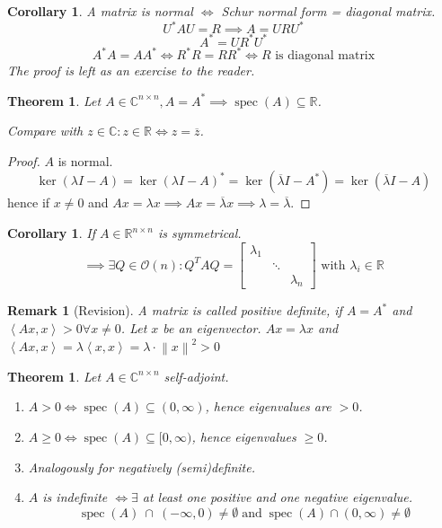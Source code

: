 \documentclass[a4paper]{article}
\newcounter{lecref}[section]
\numberwithin{lecref}{section}
\newtheorem{theorem}[lecref]{Theorem}
\newtheorem*{Remark}{Remark}
\newtheorem{corollary}[lecref]{Corollary}
\newcommand{\angel}[1]{\left\langle#1\right\rangle}
\newcommand{\norm}[1]{\left\|#1\right\|}
\begin{document}
\begin{corollary}
  A matrix is normal $\iff$ Schur normal form = diagonal matrix.
  \[ U^* AU = R \implies A = URU^* \]
  \[ A^* = UR^* U^* \]
  \[ A^* A = AA^* \iff R^* R = RR^* \iff R \text{ is diagonal matrix} \]
  The proof is left as an exercise to the reader.
\end{corollary}

\begin{theorem} %
  Let $A \in \mathbb C^{n \times n}, A = A^* \implies \operatorname{spec}(A) \subseteq \mathbb R$.

  Compare with $z \in \mathbb C: z \in \mathbb R \iff z = \overline{z}$.
\end{theorem}

\begin{proof}
  $A$ is normal.
  \[ \ker(\lambda I - A) = \ker(\lambda I - A)^* = \ker(\overline{\lambda} I - A^*) = \ker(\overline{\lambda} I - A) \]
  hence if $x \neq 0$ and $Ax = \lambda x \implies Ax = \overline{\lambda} x \implies \lambda = \overline\lambda$.
\end{proof}

\begin{corollary}
  If $A \in \mathbb R^{n \times n}$ is symmetrical.
  \[ \implies \exists Q \in \mathcal O(n): Q^T AQ = \begin{bmatrix} \lambda_1 & & \\ & \ddots & \\ & & \lambda_n \end{bmatrix} \text{ with } \lambda_i \in \mathbb R \]
\end{corollary}

\begin{Remark}[Revision]
  A matrix is called positive definite, if $A = A^*$ and $\angel{Ax,x} > 0 \forall x \neq 0$.
  Let $x$ be an eigenvector. $Ax = \lambda x$ and $\angel{Ax,x} = \lambda \angel{x,x} = \lambda \cdot \norm{x}^2 > 0$
\end{Remark}

\begin{theorem} %
  Let $A \in \mathbb C^{n \times n}$ self-adjoint.
  \begin{enumerate}
    \item $A > 0 \iff \operatorname{spec}(A) \subseteq (0,\infty)$, hence eigenvalues are $> 0$.
    \item $A \geq 0 \iff \operatorname{spec}(A) \subseteq [0, \infty)$, hence eigenvalues $\geq 0$.
    \item Analogously for negatively (semi)definite.
    \item $A$ is indefinite $\iff \exists$ at least one positive and one negative eigenvalue.
      \[ \operatorname{spec}(A) \:\cap\: (-\infty,0) \neq \emptyset \operatorname{ and } \operatorname{spec}(A) \cap (0,\infty) \neq \emptyset \]
  \end{enumerate}
\end{theorem}
\end{document}

